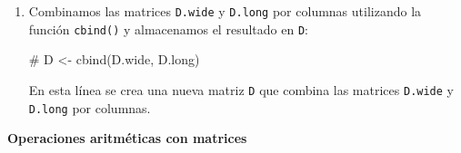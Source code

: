 \documentclass[
  jou,
  floatsintext,
  longtable,
  a4paper,
  nolmodern,
  notxfonts,
  notimes,
  12pt,
  colorlinks=true,linkcolor=blue,citecolor=blue,urlcolor=blue]{apa7}
\newenvironment{Shaded}{\begin{snugshade}}{\end{snugshade}}
\newcommand{\CommentTok}[1]{\textcolor[rgb]{0.37,0.37,0.37}{#1}}
\newcommand{\FunctionTok}[1]{\textcolor[rgb]{0.28,0.35,0.67}{#1}}
\newcommand{\NormalTok}[1]{\textcolor[rgb]{0.00,0.23,0.31}{#1}}
\newcommand{\OtherTok}[1]{\textcolor[rgb]{0.00,0.23,0.31}{#1}}
\begin{document}
\begin{enumerate}
\begin{Shaded}
\begin{Highlighting}[]
\NormalTok{D.long }\OtherTok{\textless{}{-}} \FunctionTok{rbind}\NormalTok{(A, A)}
\NormalTok{D.long}
\end{Highlighting}
\end{Shaded}

  Aquí se crea una nueva matriz \texttt{D.long} que combina las matrices
  \texttt{A} y \texttt{A} por filas.
\item
  Combinamos las matrices \texttt{D.wide} y \texttt{D.long} por columnas
  utilizando la función \texttt{cbind()} y almacenamos el resultado en
  \texttt{D}:

\begin{Shaded}
\begin{Highlighting}[]
\CommentTok{\# D \textless{}{-} cbind(D.wide, D.long)}
\end{Highlighting}
\end{Shaded}

  En esta línea se crea una nueva matriz \texttt{D} que combina las
  matrices \texttt{D.wide} y \texttt{D.long} por columnas.
\end{enumerate}

\textbf{Operaciones aritméticas con matrices}
\end{document}

